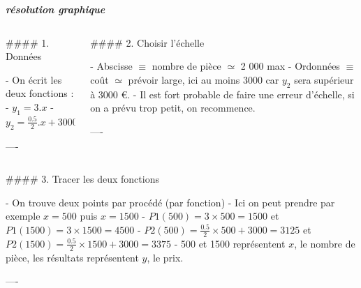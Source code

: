 \documentclass{beamer}
\begin{document}
\begin{frame}[fragile]\centering

\textbf{\textit{résolution graphique}}

\begin{columns}
\begin{column}{0.57\textwidth}

\begin{markdown}

#### 1. Données

- On écrit les deux fonctions :
- $y_1 = 3.x$
- $y_2 = \frac{0.5}{2}.x+3000$



----
\end{markdown}

\end{column}




\begin{column}{.4\textwidth}
\begin{markdown}




#### 2. Choisir l'échelle

- Abscisse $\equiv$ nombre de pièce $\simeq$ 2 000 max
- Ordonnées $\equiv$ coût $\simeq$ prévoir large, ici au moins 3000 car $y_2$ sera supérieur à 3000 \euro.
- Il est fort probable de faire une erreur d'échelle, si on a prévu trop petit, on recommence.

----
\end{markdown}


\end{column}

\end{columns}

\bigskip

\begin{markdown}

#### 3. Tracer les deux fonctions

- On trouve deux points par procédé (par fonction)
- Ici on peut prendre par exemple $x=500$ puis $x=1500$
- $P1(500)=3\times 500 = 1500$ et $P1(1500)=3\times 1500=4500$
- $P2(500)=\frac{0.5}{2}\times 500 + 3000 = 3125$ et $P2(1500)=\frac{0.5}{2}\times 1500 + 3000=3375$ 
- 500 et 1500 représentent $x$, le nombre de pièce, les résultats représentent $y$, le prix.

----

\end{markdown}




\bigskip


\end{frame}
\end{document}
